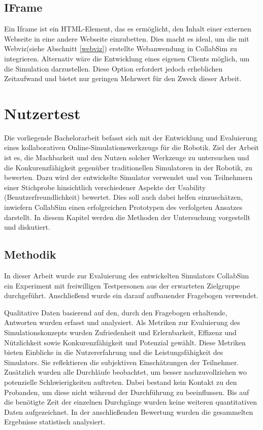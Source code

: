 \documentclass[german,version-2020-11]{uzl-thesis}
\begin{document}
\section{IFrame}
  Ein Iframe ist ein HTML-Element, das es ermöglicht, den Inhalt einer externen Webseite in eine andere Webseite einzubetten. 
  Dies macht es ideal, um die mit Webviz(siehe Abschnitt \ref{webviz}) erstellte Webanwendung in CollabSim zu integrieren. 
  Alternativ wäre die Entwicklung eines eigenen Clients möglich, um die Simulation darzustellen. 
  Diese Option erfordert jedoch erheblichen Zeitaufwand und bietet nur geringen Mehrwert für den Zweck dieser Arbeit.



\chapter{Nutzertest} 
\label{chapter-test}

  Die vorliegende Bachelorarbeit befasst sich mit der Entwicklung und Evaluierung eines kollaborativen Online-Simulationswerkzeugs für die Robotik. 
  Ziel der Arbeit ist es, die Machbarkeit und den Nutzen solcher Werkzeuge zu untersuchen und die Konkurenzfähigkeit gegenüber traditionellen Simulatoren in der Robotik, zu bewerten. 
  Dazu wird der entwickelte Simulator verwendet und von Teilnehmern einer Stichprobe hinsichtlich verschiedener Aspekte der Usability (Benutzerfreundlichkeit) bewertet.
  Dies soll auch dabei helfen einzuschätzen, inwiefern CollabSim einen erfolgreichen Prototypen des verfolgeten Ansatzes darstellt.
  In diesem Kapitel werden die Methoden der Untersuchung vorgestellt und diskutiert.


\section{Methodik}
  In dieser Arbeit wurde zur Evaluierung des entwickelten Simulators CollabSim ein 
  Experiment mit freiwilligen Testpersonen aus der erwarteten Zielgruppe durchgeführt. 
  Anschließend wurde ein darauf aufbauender Fragebogen verwendet.

  Qualitative Daten basierend auf den, durch den Fragebogen erhaltende, Antworten wurden erfasst und analysiert.  
  Als Metriken zur Evaluierung des Simulationskonzepts wurden Zufriedenheit und Erlernbarkeit, Effizenz und Nützlichkeit sowie Konkurenzfähigkeit und Potenzial gewählt.
  Diese Metriken bieten Einblicke in die Nutzererfahrung und die Leistungsfähigkeit des Simulators. Sie reflektieren die subjektiven Einschätzungen der Teilnehmer.
  Zusätzlich wurden alle Durchläufe beobachtet, um besser nachzuvollziehen wo potenzielle Schhwierigkeiten auftreten.
  Dabei bestand kein Kontakt zu den Probanden, um diese nicht während der Durchführung zu beeinflussen.
  Bis auf die benötigte Zeit der einzelnen Durchgänge wurden keine weiteren quantitativen Daten aufgezeichnet. 
  In der anschließenden Bewertung wurden die gesammelten Ergebnisse statistisch analysiert.
\end{document}
